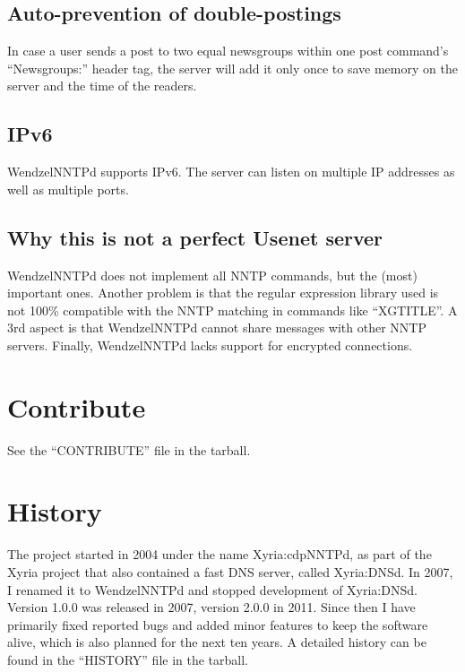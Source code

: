 \subsection{Auto-prevention of double-postings}

In case a user sends a post to two equal newsgroups within one post command's ``Newsgroups:'' header tag, the server will add it only once to save memory on the server and the time of the readers.

\subsection{IPv6}

WendzelNNTPd supports IPv6. The server can listen on multiple IP addresses as well as multiple ports.

\subsection{Why this is not a perfect Usenet server}

WendzelNNTPd does not implement all NNTP commands, but the (most) important ones. Another problem is that the regular expression library used is not 100\% compatible with the NNTP matching in commands like ``XGTITLE''. A 3rd aspect is that WendzelNNTPd cannot share messages with other NNTP servers. Finally, WendzelNNTPd lacks support for encrypted connections.

\section{Contribute}

See the ``CONTRIBUTE'' file in the tarball.

\section{History}

The project started in 2004 under the name Xyria:cdpNNTPd, as part of the Xyria project that also contained a fast DNS server, called Xyria:DNSd. In 2007, I renamed it to WendzelNNTPd and stopped development of Xyria:DNSd. Version 1.0.0 was released in 2007, version 2.0.0 in 2011. Since then I have primarily fixed reported bugs and added minor features to keep the software alive, which is also planned for the next ten years. A detailed history can be found in the ``HISTORY'' file in the tarball.





